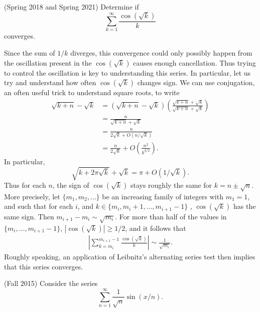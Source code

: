 \documentclass{exam}
\DeclareMathOperator{\RR}{\mathbb{R}}
\theoremstyle{problemstyle}
\newcommand{\1}[1]{\textbf{1}_{\left[#1\right]}} %
\begin{document}
\begin{questions}
\question (Spring 2018 and Spring 2021) Determine if
%
\[ \sum_{k = 1}^\infty \frac{\cos(\sqrt{k})}{k} \]
%
converges.
\begin{solution}
    Since the sum of $1/k$ diverges, this convergence could only possibly happen from the oscillation present in the $\cos(\sqrt{k})$ causes enough cancellation. Thus trying to control the oscillation is key to understanding this series. In particular, let us try and understand how often $\cos(\sqrt{k})$ changes sign. We can use conjugation, an often useful trick to understand square roots, to write
    \begin{align*}
        \sqrt{k+n} - \sqrt{k} &= (\sqrt{k+n} - \sqrt{k}) \left( \frac{\sqrt{k+n} + \sqrt{k}}{\sqrt{k+n} + \sqrt{k}} \right)\\
        &= \frac{n}{\sqrt{k+n} + \sqrt{k}}\\
        &= \frac{n}{2\sqrt{k} + O(n/\sqrt{k})}\\
        &= \frac{n}{2\sqrt{k}} + O \left( \frac{n^2}{k^{3/2}} \right).
    \end{align*}
    In particular,
    \[ \sqrt{k + 2 \pi \sqrt{k}} + \sqrt{k} = \pi + O(1/\sqrt{k}). \]
    Thus for each $n$, the sign of $\cos(\sqrt{k})$ stays roughly the same for $k = n \pm \sqrt{n}$. More precisely, let $\{ m_1, m_2, \dots \}$ be an increasing family of integers with $m_1 = 1$, and such that for each $i$, and $k \in \{ m_i, m_i + 1, \dots, m_{i+1} - 1 \}$ , $\cos(\sqrt{k})$ has the same sign. Then $m_{i+1} - m_i \sim \sqrt{m_i}$. For more than half of the values in $\{ m_i, \dots, m_{i+1} - 1 \}$, $|\cos(\sqrt{k})| \geq 1/2$, and it follows that
    \begin{align*}
        \left| \sum_{k = m_i}^{m_{i+1} - 1} \frac{\cos(\sqrt{k})}{k} \right| \sim \frac{1}{\sqrt{m_i}}.
    \end{align*}
    Roughly speaking, an application of Leibnitz's alternating series test then implies that this series converges.
\end{solution}


\question (Fall 2015) Consider the series
%
$$ \sum_{n = 1}^\infty \frac{1}{\sqrt{n}} \sin(x/n). $$
%
\end{questions}
\end{document}
